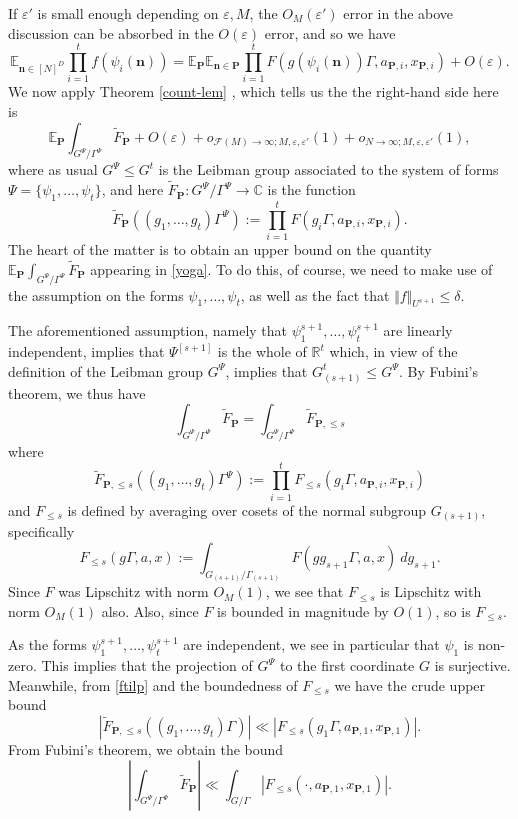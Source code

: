 \documentclass[11pt,reqno]{amsart}
\numberwithin{equation}{section}
\theoremstyle{plain}
\theoremstyle{definition}
\renewcommand{\leq}{\leqslant}
\newcommand\E{{\mathbb{E}}}
\newcommand\R{\mathbb{R}}
\newcommand\C{\mathbb{C}}
\newcommand\1{{\bf 1}}
\newcommand\2{{\bf 2}}
\newcommand\eps{\varepsilon}
\newcommand\Grow{{\mathcal F}}
\begin{document}
If $\eps'$ is small enough depending on $\eps,M$, the $O_M(\eps')$ error in the above discussion can be absorbed in the $O(\eps)$ error, and so we have
$$\E_{\mathbf{n} \in [N]^D} \prod_{i=1}^t f( \psi_i(\mathbf{n}) ) 
 = \E_{{\mathbf{P}}} \E_{\mathbf{n} \in {\mathbf{P}}} \prod_{i=1}^t F( g(\psi_i(\mathbf{n})) \Gamma, a_{{\mathbf{P}},i}, x_{{\mathbf{P}},i} ) + O(\eps).$$
We now apply Theorem \ref{count-lem} , which tells us the the right-hand side here is
\begin{equation}\label{yoga}
\E_{{\mathbf{P}}} \int_{G^{\Psi}/\Gamma^{\Psi} }\tilde F_{{\mathbf{P}}} + O(\eps) + o_{\Grow(M) \to\infty;M,\eps,\eps'}(1)
+ o_{N \to\infty;M,\eps,\eps'}(1),
\end{equation}
where as usual $G^{\Psi} \leq G^t$ is the Leibman group associated to the system of forms $\Psi = \{\psi_1,\dots,\psi_t\}$, and here $\tilde F_{{\mathbf{P}}}: G^{\Psi}/\Gamma^{\Psi} \to \C$ is the function
$$ \tilde F_{{\mathbf{P}}}((g_1,\ldots,g_t)\Gamma^{\Psi}) := \prod_{i=1}^t F(g_i\Gamma, a_{{\mathbf{P}},i}, x_{{\mathbf{P}},i} ).$$
The heart of the matter is to obtain an upper bound on the quantity $\E_{{\mathbf{P}}} \int_{G^{\Psi}/\Gamma^{\Psi} }\tilde F_{{\mathbf{P}}}$ appearing in \eqref{yoga}. To do this, of course, we need to make use of the assumption on the forms $\psi_1,\dots,\psi_t$, as well as the fact that $\Vert f \Vert_{U^{s+1}} \leq \delta$.

The aforementioned assumption, namely that $\psi_1^{s+1},\ldots,\psi_t^{s+1}$ are linearly independent, implies that $\Psi^{[s+1]}$ is the whole of $\R^t$ which, in view of the definition of the Leibman group $G^{\Psi}$, implies that $G_{(s+1)}^t \leq G^{\Psi}$.  By Fubini's theorem, we thus have
$$ \int_{G^{\Psi}/\Gamma^{\Psi}} \tilde F_{{\mathbf{P}}} = \int_{G^{\Psi}/\Gamma^{\Psi}} \tilde F_{{\mathbf{P}},\leq s}$$
where
\begin{equation}\label{ftilp}
 \tilde F_{{\mathbf{P}},\leq s}((g_1,\ldots,g_t)\Gamma^{\Psi}) := \prod_{i=1}^t F_{\leq s}(g_i\Gamma, a_{{\mathbf{P}},i}, x_{{\mathbf{P}},i} )
\end{equation}
and $F_{\leq s}$ is defined by averaging over cosets of the normal subgroup $G_{(s+1)}$, specifically
$$ F_{\leq s}(g\Gamma,a,x) := \int_{G_{(s+1)}/\Gamma_{(s+1)}} F(g g_{s+1} \Gamma,a,x)\ dg_{s+1}.$$
Since $F$ was Lipschitz with norm $O_M(1)$, we see that $F_{\leq s}$ is Lipschitz with norm $O_M(1)$ also.  Also, since $F$ is bounded in magnitude by $O(1)$, so is $F_{\leq s}$.

As the forms $\psi_1^{s+1},\ldots,\psi_t^{s+1}$ are independent, we see in particular that $\psi_1$ is non-zero.  This implies that the projection of $G^{\Psi}$ to the first coordinate $G$ is surjective.  Meanwhile, from \eqref{ftilp} and the boundedness of $F_{\leq s}$ we have the crude upper bound
$$
|\tilde F_{{\mathbf{P}},\leq s}((g_1,\ldots,g_t)\Gamma)| \ll |F_{\leq s}(g_1\Gamma, a_{{\mathbf{P}},1}, x_{{\mathbf{P}},1} )|.$$
From Fubini's theorem, we obtain the bound
\begin{equation}\label{tfap}
 |\int_{G^{\Psi}/\Gamma^{\Psi}} \tilde F_{{\mathbf{P}}}| \ll \int_{G/\Gamma} |F_{\leq s}(\cdot, a_{{\mathbf{P}},1}, x_{{\mathbf{P}},1} )|.
\end{equation}
\end{document}
